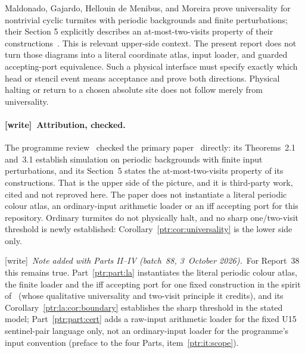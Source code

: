 \documentclass[11pt,letterpaper]{article}
\theoremstyle{definition}\newtheorem{definition}[theorem]{Definition}
\theoremstyle{remark}\newtheorem{remark}[theorem]{Remark}
\newcommand{\wtag}{\textup{[write]}}
\newcommand{\bnote}{\wtag\ \emph{Note added with Parts II--IV (batch~88, 3~October 2026).}}
\begin{document}
Maldonado, Gajardo, Hellouin de Menibus, and Moreira prove universality for nontrivial cyclic turmites with periodic backgrounds and finite perturbations; their Section 5 explicitly describes an at-most-two-visits property of their constructions~\cite{maldonado}. This is relevant upper-side context. The present report does not turn those diagrams into a literal coordinate atlas, input loader, and guarded accepting-port equivalence. Such a physical interface must specify exactly which head or stencil event means acceptance and prove both directions. Physical halting or return to a chosen absolute site does not follow merely from universality.

{\small
\paragraph{\wtag\ Attribution, checked.} The programme review~\cite{review38}
checked the primary paper~\cite{maldonado} directly: its Theorems~2.1
and~3.1 establish simulation on periodic backgrounds with finite input
perturbations, and its Section~5 states the at-most-two-visits property of
its constructions. That is the upper side of the picture, and it is
third-party work, cited and not reproved here. The paper does not
instantiate a literal periodic colour atlas, an ordinary-input arithmetic
loader or an iff accepting port for this repository. Ordinary turmites do
not physically halt, and no sharp one/two-visit threshold is newly
established: Corollary~\ref{ptr:cor:universality} is the lower side only.

\bnote\ For Report~38 this remains true. Part~\ref{ptr:part:la} instantiates
the literal periodic colour atlas, the finite loader and the iff accepting
port for one fixed construction in the spirit of~\cite{maldonado} (whose
qualitative universality and two-visit principle it credits), and its
Corollary~\ref{ptr:la:cor:boundary} establishes the sharp threshold in the
stated model; Part~\ref{ptr:part:cert} adds a raw-input arithmetic loader for
the fixed U15 sentinel-pair language only, not an ordinary-input loader for
the programme's input convention (preface to the four Parts,
item~\ref{ptr:it:scope}).

}
\end{document}

